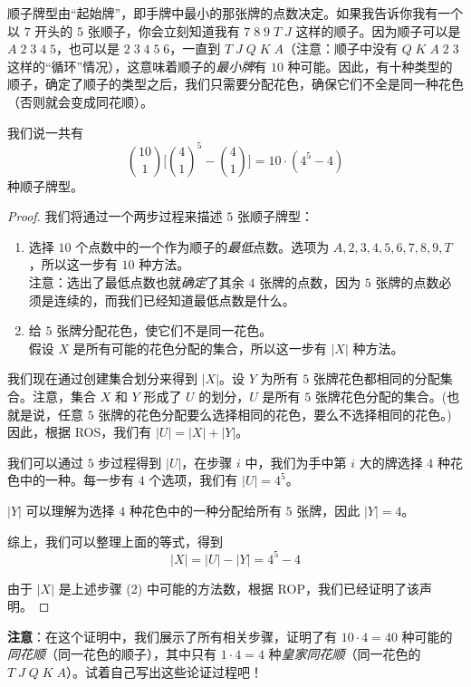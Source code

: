 \begin{example}[顺子]

    顺子牌型由``起始牌''，即手牌中最小的那张牌的点数决定。如果我告诉你我有一个以 $7$ 开头的 $5$ 张顺子，你会立刻知道我有 $7\;8\;9\;T\;J$ 这样的顺子。因为顺子可以是 $A\;2\;3\;4\;5$，也可以是 $2\;3\;4\;5\;6$，一直到 $T\;J\;Q\;K\;A$（注意：顺子中没有 $Q\;K\;A\;2\;3$ 这样的``循环''情况），这意味着顺子的\emph{最小牌}有 $10$ 种可能。因此，有十种类型的顺子，确定了顺子的类型之后，我们只需要分配花色，确保它们不全是同一种花色（否则就会变成同花顺）。

    我们说一共有
    \[{10 \choose 1}\Bigg[{4 \choose 1}^5 - {4 \choose 1}\Bigg]=10 \cdot (4^5-4)\]
    种顺子牌型。

    \begin{proof}
        我们将通过一个两步过程来描述 $5$ 张顺子牌型：
        \begin{enumerate}[label=(\arabic*)]
            \item 选择 $10$ 个点数中的一个作为顺子的\emph{最低}点数。选项为 $A,2,3,4,5,6,7,8,9,T$，所以这一步有 $10$ 种方法。\\
                  注意：选出了最低点数也就\emph{确定}了其余 $4$ 张牌的点数，因为 $5$ 张牌的点数必须是连续的，而我们已经知道最低点数是什么。
            \item 给 $5$ 张牌分配花色，使它们不是同一花色。\\
                  假设 $X$ 是所有可能的花色分配的集合，所以这一步有 $|X|$ 种方法。
        \end{enumerate}

        我们现在通过创建集合划分来得到 $|X|$。设 $Y$ 为所有 $5$ 张牌花色都相同的分配集合。注意，集合 $X$ 和 $Y$ 形成了 $U$ 的划分，$U$ 是所有 $5$ 张牌花色分配的集合。(也就是说，任意 $5$ 张牌的花色分配要么选择相同的花色，要么不选择相同的花色。) 因此，根据 ROS，我们有 $|U| = |X| + |Y|$。

        我们可以通过 $5$ 步过程得到 $|U|$，在步骤 $i$ 中，我们为手中第 $i$ 大的牌选择 $4$ 种花色中的一种。每一步有 $4$ 个选项，我们有 $|U| = 4^5$。

        $|Y|$ 可以理解为选择 $4$ 种花色中的一种分配给所有 $5$ 张牌，因此 $|Y| = 4$。

        综上，我们可以整理上面的等式，得到
        \[|X| = |U| - |Y| = 4^5 - 4\]

        由于 $|X|$ 是上述步骤 (2) 中可能的方法数，根据 ROP，我们已经证明了该声明。
    \end{proof}

    \textbf{注意}：在这个证明中，我们展示了所有相关步骤，证明了有 $10 \cdot 4 = 40$ 种可能的\emph{同花顺}（同一花色的顺子），其中只有 $1 \cdot 4 = 4$ 种\emph{皇家同花顺}（同一花色的 $T\;J\;Q\;K\;A$）。试着自己写出这些论证过程吧！
\end{example}